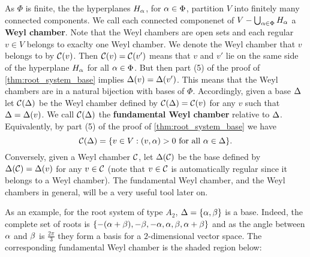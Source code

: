 \documentclass[12pt,reqno,oneside]{amsart}
\begin{document}
    As $\Phi$ is finite, the the hyperplanes $H_{\alpha}$, for $\alpha \in \Phi$, partition $V$ into finitely many connected components. We call each connected componenet of $V-\bigcup_{\alpha \in \Phi}H_{\alpha}$ a \textbf{Weyl chamber}. Note that the Weyl chambers are open sets and each regular $v \in V$ belongs to exaclty one Weyl chamber. We denote the Weyl chamber that $v$ belongs to by $\mathcal{C}(v)$. Then $\mathcal{C}(v) = \mathcal{C}(v')$ means that $v$ and $v'$ lie on the same side of the hyperplane $H_{\alpha}$ for all $\alpha \in \Phi$. But then part (5) of the proof of \cref{thm:root_system_base} implies $\Delta(v) = \Delta(v')$. This means that the Weyl chambers are in a natural bijection with bases of $\Phi$. Accordingly, given a base $\Delta$ let $\mathcal{C}(\Delta)$ be the Weyl chamber defined by $\mathcal{C}(\Delta) = \mathcal{C}(v)$ for any $v$ such that $\Delta = \Delta(v)$. We call $\mathcal{C}(\Delta)$ the \textbf{fundamental Weyl chamber} relative to $\Delta$. Equivalently, by part (5) of the proof of \cref{thm:root_system_base} we have
    \[
        \mathcal{C}(\Delta) = \{v \in V:(v,\alpha) > 0 \text{ for all } \alpha \in \Delta\}.
    \]
    Conversely, given a Weyl chamber $\mathcal{C}$, let $\Delta(\mathcal{C})$ be the base defined by $\Delta(\mathcal{C}) = \Delta(v)$ for any $v \in \mathcal{C}$ (note that $v \in \mathcal{C}$ is automatically regular since it belongs to a Weyl chamber). The fundamental Weyl chamber, and the Weyl chambers in general, will be a very useful tool later on. 
    
    As an example, for the root system of type $A_{2}$, $\Delta = \{\alpha,\beta\}$ is a base. Indeed, the complete set of roots is $\{-(\alpha+\beta),-\beta,-\alpha,\alpha,\beta,\alpha+\beta\}$ and as the angle between $\alpha$ and $\beta$ is $\frac{2\pi}{3}$ they form a basis for a $2$-dimensional vector space. The corresponding fundamental Weyl chamber is the shaded region below:

    \begin{center}
    \end{center}
    
\end{document}
